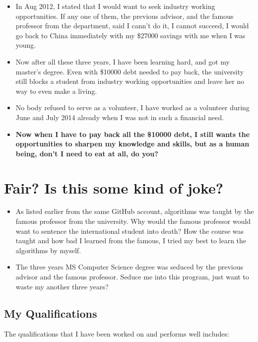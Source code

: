 \documentclass[9pt,b5paper]{article}
\begin{document}
\begin{itemize}
\begin{itemize}
\item In Aug 2012, I stated that I would want to seek industry working opportunities. If any one of them, the previous advisor, and the famous professor from the department, said I cann't do it, I cannot succeed, I would go back to China immediately with my \$27000 savings with me when I was young.
\item Now after all these three years, I have been learning hard, and got my master's degree. Even with \$10000 debt needed to pay back, the university still blocks a student from industry working opportunities and leave her no way to even make a living.
\item No body refused to serve as a volunteer, I have worked as a volunteer during June and July 2014 already when I was not in such a financial need.
\item \textbf{Now when I have to pay back all the \$10000 debt, I still wants the opportunities to sharpen my knowledge and skills, but as a human being, don't I need to eat at all, do you?}
\end{itemize}
\end{itemize}

\section{Fair? Is this some kind of joke?}
\label{sec-8}
\begin{itemize}
\item As listed earlier from the same GitHub account, algorithms was taught by the famous professor from the university. Why would the famous professor would want to sentence the international student into death? How the course was taught and how bad I learned from the famous, I tried my best to learn the algorithms by myself.
\item The three years MS Computer Science degree was seduced by the previous advisor and the famous professor. Seduce me into this program, just want to waste my another three years?
\end{itemize}
\subsection{My Qualifications}
\label{sec-8-1}
The qualifications that I have been worked on and performs well includes: 
\end{document}
